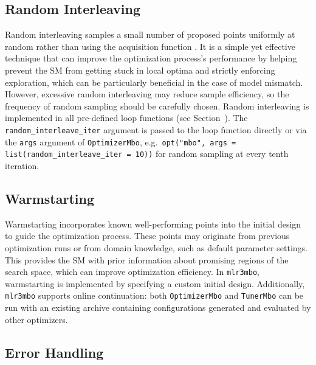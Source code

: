 \documentclass[12pt,letterpaper]{article}
\begin{document}
\subsection*{Random Interleaving}

\label{sec:random-interleaving}

Random interleaving samples a small number of proposed points uniformly at random rather than using the acquisition function \cite{bull2011,hutter2011}.
It is a simple yet effective technique that can improve the optimization process's performance by helping prevent the SM from getting stuck in local optima and strictly enforcing exploration, which can be particularly beneficial in the case of model mismatch\cite{ahmed2016}.
However, excessive random interleaving may reduce sample efficiency, so the frequency of random sampling should be carefully chosen.
Random interleaving is implemented in all pre-defined loop functions (see Section~).
The \texttt{random\_interleave\_iter} argument is passed to the loop function directly or via the \texttt{args} argument of \texttt{OptimizerMbo}, e.g.\ \texttt{opt("mbo", args = list(random\_interleave\_iter = 10))} for random sampling at every tenth iteration.

\subsection*{Warmstarting}

\label{sec:warmstarting}

Warmstarting incorporates known well-performing points into the initial design to guide the optimization process\cite{feurer2015}.
These points may originate from previous optimization runs or from domain knowledge, such as default parameter settings.
This provides the SM with prior information about promising regions of the search space, which can improve optimization efficiency.
In \texttt{mlr3mbo}, warmstarting is implemented by specifying a custom initial design.
Additionally, \texttt{mlr3mbo} supports online continuation: both \texttt{OptimizerMbo} and \texttt{TunerMbo} can be run with an existing archive containing configurations generated and evaluated by other optimizers.

\subsection*{Error Handling}

\label{sec:error-handling}
\end{document}
